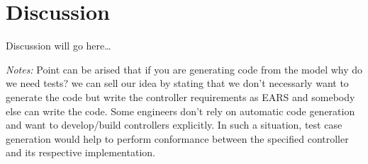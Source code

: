 \section{Discussion}
Discussion will go here\ldots

\emph{Notes:} 
Point can be arised that if you are generating code from the model why do we need tests? we can sell our
idea by stating that we don't necessarly want to generate the code but write the
controller requirements as EARS and somebody else can write the code. Some
engineers don't rely on automatic code generation and want to develop/build
controllers explicitly. In such a situation, test case generation would help to
perform conformance between the specified controller and its respective implementation.